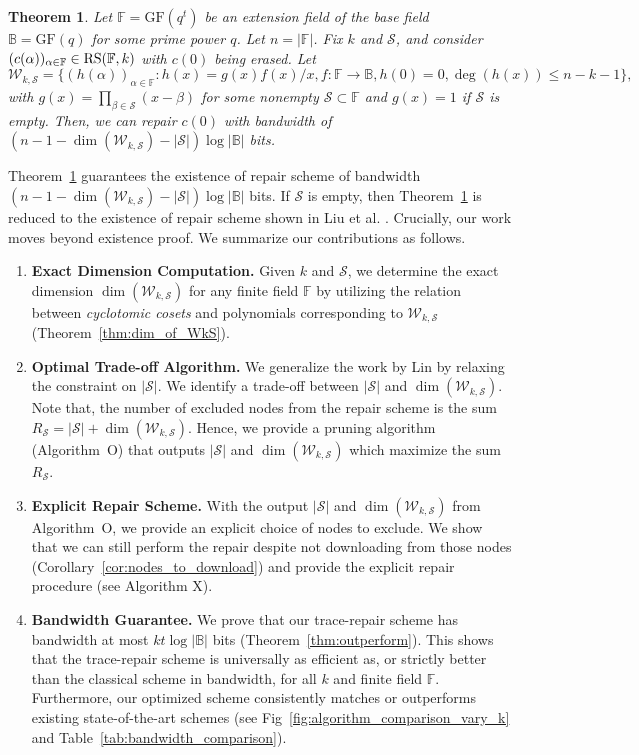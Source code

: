 \documentclass[onecolumn]{IEEEtran}
\theoremstyle{plain}
\newtheorem{theorem}{Theorem}
\theoremstyle{definition}
\newcommand{\FF}{\mathbb{F}}
\newcommand{\BB}{\mathbb{B}}
\newcommand{\GF}{{\mathrm{GF}}}
\newcommand{\cS}{\mathcal{S}}
\newcommand{\cW}{\mathcal{W}}
\newcommand{\rs}{{\rm RS}}
\newcommand{\hanmao}[1]{{\color{magenta} (HM: #1)}}
\begin{document}
\begin{theorem}\label{thm:main_theorem}
    Let $\FF = \GF(q^t)$ be an extension field of the base field $\BB = \GF(q)$ for some prime power $q$. Let $n = |\FF|$. Fix $k$ and $\cS$, and consider $(c(\alpha))_{\alpha\in\FF}\in\rs(\FF,k)$ with $c(0)$ being erased. 
Let
    $$\cW_{k,\cS} = \{(h(\alpha))_{\alpha\in\FF}:h(x) = g(x)f(x)/x, f:\FF\to\BB, h(0) = 0, \deg(h(x))\le n-k-1\},$$
    with $g(x) = \prod_{\beta\in\cS} (x-\beta)$ for some nonempty $\cS\subset\FF$ and $g(x) = 1$ if $\cS$ is empty.
    Then, we can repair $c(0)$ with bandwidth of $(n-1-\dim(\cW_{k,\cS})-|\cS|)\log|\BB|$ bits. 
\end{theorem}

Theorem~\ref{thm:main_theorem} guarantees the existence of repair scheme of bandwidth $(n-1-\dim(\cW_{k,\cS})-|\cS|)\log|\BB|$ bits. If $\cS$ is empty, then Theorem~\ref{thm:main_theorem} is reduced to the existence of repair scheme shown in Liu et al. \cite{Liu2024}. Crucially, our work moves beyond existence proof. We summarize our contributions as follows.
\begin{enumerate}[leftmargin=*]
    \item \textbf{Exact Dimension Computation.} Given $k$ and $\cS$, we determine the exact dimension $\dim(\cW_{k,\cS})$ for any finite field $\FF$ by utilizing the relation between \textit{cyclotomic cosets} and polynomials corresponding to $\cW_{k,\cS}$ (Theorem~\ref{thm:dim_of_WkS}).
    \item \textbf{Optimal Trade-off Algorithm.} We generalize the work by Lin \cite{Lin2023} by relaxing the constraint on $|\cS|$. We identify a trade-off between $|\cS|$ and $\dim(\cW_{k,\cS})$. Note that, the number of excluded nodes from the repair scheme is the sum $R_{\cS} = |\cS| + \dim(\cW_{k,\cS})$. Hence, we provide a pruning algorithm (Algorithm~O) that outputs $|\cS|$ and $\dim(\cW_{k,\cS})$ which maximize the sum $R_{\cS}$.
    \item \textbf{Explicit Repair Scheme.} With the output $|\cS|$ and $\dim(\cW_{k,\cS})$ from Algorithm~O, we provide an explicit choice of nodes to exclude. We show that we can still perform the repair despite not downloading from those nodes (Corollary~\ref{cor:nodes_to_download}) and provide the explicit repair procedure (see Algorithm X).
    \item \textbf{Bandwidth Guarantee.} We prove that our trace-repair scheme has bandwidth at most $kt\log|\BB|$ bits (Theorem~\ref{thm:outperform}). This shows that the trace-repair scheme is universally as efficient as, or strictly better than the classical scheme in bandwidth, for all $k$ and finite field $\FF$. Furthermore, our optimized scheme consistently matches or outperforms existing state-of-the-art schemes (see Fig~\ref{fig:algorithm_comparison_vary_k} and Table~\ref{tab:bandwidth_comparison}).
\end{enumerate}
\end{document}
